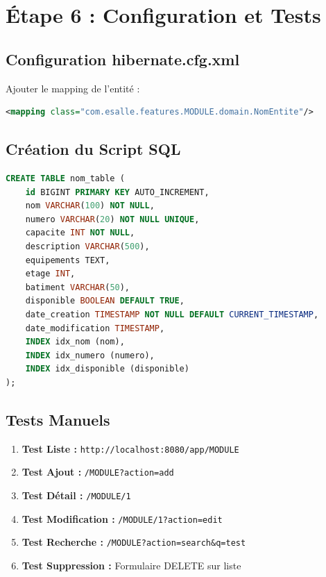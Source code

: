 \documentclass[12pt,a4paper]{article}
\begin{document}
\section{Étape 6 : Configuration et Tests}

\subsection{Configuration hibernate.cfg.xml}

Ajouter le mapping de l'entité :

\begin{lstlisting}[language=XML, caption=hibernate.cfg.xml]
<mapping class="com.esalle.features.MODULE.domain.NomEntite"/>
\end{lstlisting}

\subsection{Création du Script SQL}

\begin{lstlisting}[language=SQL, caption=schema.sql]
CREATE TABLE nom_table (
    id BIGINT PRIMARY KEY AUTO_INCREMENT,
    nom VARCHAR(100) NOT NULL,
    numero VARCHAR(20) NOT NULL UNIQUE,
    capacite INT NOT NULL,
    description VARCHAR(500),
    equipements TEXT,
    etage INT,
    batiment VARCHAR(50),
    disponible BOOLEAN DEFAULT TRUE,
    date_creation TIMESTAMP NOT NULL DEFAULT CURRENT_TIMESTAMP,
    date_modification TIMESTAMP,
    INDEX idx_nom (nom),
    INDEX idx_numero (numero),
    INDEX idx_disponible (disponible)
);
\end{lstlisting}

\subsection{Tests Manuels}

\begin{enumerate}
    \item \textbf{Test Liste :} \texttt{http://localhost:8080/app/MODULE}
    \item \textbf{Test Ajout :} \texttt{/MODULE?action=add}
    \item \textbf{Test Détail :} \texttt{/MODULE/1}
    \item \textbf{Test Modification :} \texttt{/MODULE/1?action=edit}
    \item \textbf{Test Recherche :} \texttt{/MODULE?action=search\&q=test}
    \item \textbf{Test Suppression :} Formulaire DELETE sur liste
\end{enumerate}
\end{document}
